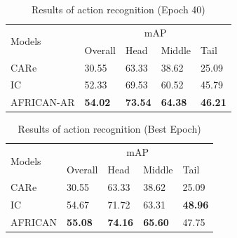 \begin{table}[h]
    \centering
    \caption{Results of action recognition (Epoch 40)}
    \label{tab:allresults40}
    \begin{tabular}{lllll}
        \toprule
        \multirow{2}{*}{Models} & \multicolumn{4}{c}{mAP} \\
        \cmidrule{2-5} 
        {} & Overall & Head  & Middle & Tail \\
        \midrule
        CARe          & 30.55   & 63.33 & 38.62 & 25.09 \\
        IC            & 52.33   & 69.53 & 60.52 & 45.79 \\        
        AFRICAN-AR    & \textbf{54.02} & \textbf{73.54} & \textbf{64.38} & \textbf{46.21} \\
        \bottomrule
    \end{tabular}
\end{table}

\begin{table}[h]
    \centering
    \caption{Results of action recognition (Best Epoch)}
    \label{tab:allresultsbest}
    \begin{tabular}{lllll}
        \toprule
        \multirow{2}{*}{Models} & \multicolumn{4}{c}{mAP} \\
        \cmidrule{2-5} 
        {} & Overall & Head  & Middle & Tail \\
        \midrule
        CARe        & 30.55   & 63.33 & 38.62  & 25.09 \\
        IC          & 54.67   & 71.72 & 63.31 & \textbf{48.96} \\
        AFRICAN     & \textbf{55.08} & \textbf{74.16} & \textbf{65.60} & 47.75 \\
        \bottomrule
    \end{tabular}
\end{table}










